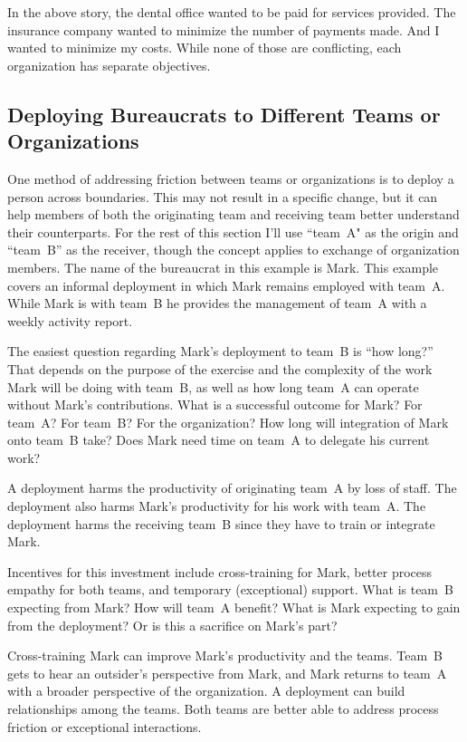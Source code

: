 In the above story, the dental office wanted to be paid for services provided. The insurance company wanted to minimize the number of payments made. And I wanted to minimize my costs. While none of those are conflicting, each organization has separate objectives.

\subsection*{Deploying Bureaucrats to Different Teams or Organizations\label{sec:prisoner-exchange}}

One method of addressing friction between teams or organizations is to deploy a person across boundaries. This may not result in a specific change, but it can help members of both the originating team and receiving team better understand their counterparts. For the rest of this section I'll use ``team~A" as the origin and ``team~B'' as the receiver, though the concept applies to exchange of organization members. The name of the bureaucrat in this example is Mark. This example covers an informal deployment in which Mark remains employed with team~A. While Mark is with team~B he provides the management of team~A with a weekly activity report. 

The easiest question regarding Mark's deployment to team~B is ``how long?'' That depends on the purpose of the exercise and the complexity of the work Mark will be doing with team~B, as well as how long team~A can operate without Mark's contributions. What is a successful outcome for Mark? For team~A? For team~B? For the organization? How long will integration of Mark onto team~B take? Does Mark need time on team~A to delegate his current work?

A deployment harms the productivity of originating team~A by loss of staff. The deployment also harms Mark's productivity for his work with team~A. The deployment harms the receiving team~B since they have to train or integrate Mark. 

Incentives for this investment include cross-training for Mark, better process empathy for both teams, and temporary (exceptional) support. What is team~B expecting from Mark? How will team~A benefit? What is Mark expecting to gain from the deployment? Or is this a sacrifice on Mark's part? 

Cross-training Mark can improve Mark's productivity  and the teams. 
Team~B gets to hear an outsider's perspective from Mark, and Mark returns to team~A with a broader perspective of the organization.
A deployment can build relationships among the teams. Both teams are better able to address process friction or exceptional interactions. 


